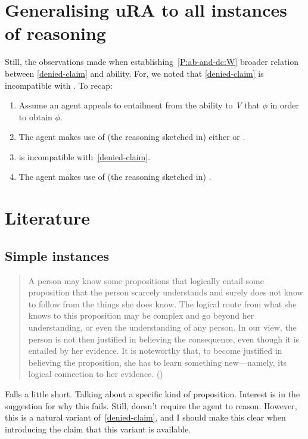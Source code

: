 \section{Generalising uRA to all instances of reasoning}
\label{sec:generalising-ura-all}

\begin{note}
  Still, the observations made when establishing~\ref{P:ab-and-dc:W} broader relation between \ref{denied-claim} and ability.
  For, we noted that \ref{denied-claim} is incompatible with \WR{}.
  To recap:
  \begin{enumerate}[label=(B\arabic*), ref=(B\arabic*)]
  \item Assume an agent appeals to entailment from the ability to \emph{V} that \(\phi\) in order to obtain \(\phi\).
  \item The agent makes use of (the reasoning sketched in) either \AR{} or \WR{}.
  \item \WR{} is incompatible with~\ref{denied-claim}.
  \item The agent makes use of (the reasoning sketched in) \AR{}.
  \end{enumerate}
\end{note}



\section{Literature}
\label{sec:literature}

\subsection{Simple instances}
\label{sec:simple-instances}

\begin{quote}
  A person may know some propositions that logically entail some proposition that the person scarcely understands and surely does not know to follow from the things she does know.
  The logical route from what she knows to this proposition may be complex and go beyond her understanding, or even the understanding of any person.
  In our view, the person is not then justiﬁed in believing the consequence, even though it is entailed by her evidence.
  It is noteworthy that, to become justiﬁed in believing the proposition, she has to learn something new---namely, its logical connection to her evidence.\nolinebreak
  \mbox{}\hfill\mbox{(\citeyear[94]{Conee:wk})}
\end{quote}
Falls a little short.
Talking about a specific kind of proposition.
Interest is in the suggestion for why this fails.
Still, doesn't require the agent to reason.
However, this is a natural variant of~\ref{denied-claim}, {\color{red} and I should make this clear when introducing the claim that this variant is available}.


